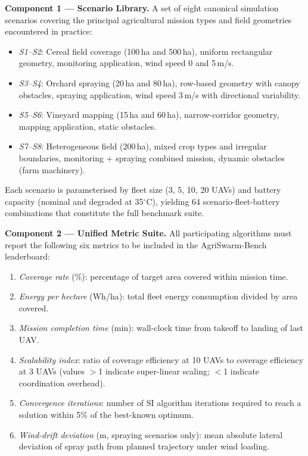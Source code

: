 \documentclass[review,3p,times]{elsarticle}
\begin{document}
\textbf{Component 1 --- Scenario Library.} A set of eight canonical simulation scenarios covering the principal agricultural mission types and field geometries encountered in practice:
\begin{itemize}
  \item \textit{S1--S2}: Cereal field coverage (100\,ha and 500\,ha), uniform rectangular geometry, monitoring application, wind speed 0 and 5\,m/s.
  \item \textit{S3--S4}: Orchard spraying (20\,ha and 80\,ha), row-based geometry with canopy obstacles, spraying application, wind speed 3\,m/s with directional variability.
  \item \textit{S5--S6}: Vineyard mapping (15\,ha and 60\,ha), narrow-corridor geometry, mapping application, static obstacles.
  \item \textit{S7--S8}: Heterogeneous field (200\,ha), mixed crop types and irregular boundaries, monitoring + spraying combined mission, dynamic obstacles (farm machinery).
\end{itemize}
Each scenario is parameterised by fleet size (3, 5, 10, 20 UAVs) and battery capacity (nominal and degraded at 35$^\circ$C), yielding 64 scenario-fleet-battery combinations that constitute the full benchmark suite.

\textbf{Component 2 --- Unified Metric Suite.} All participating algorithms must report the following six metrics to be included in the AgriSwarm-Bench leaderboard:
\begin{enumerate}
  \item \textit{Coverage rate} (\%): percentage of target area covered within mission time.
  \item \textit{Energy per hectare} (Wh/ha): total fleet energy consumption divided by area covered.
  \item \textit{Mission completion time} (min): wall-clock time from takeoff to landing of last UAV.
  \item \textit{Scalability index}: ratio of coverage efficiency at 10 UAVs to coverage efficiency at 3 UAVs (values $>$1 indicate super-linear scaling; $<$1 indicate coordination overhead).
  \item \textit{Convergence iterations}: number of SI algorithm iterations required to reach a solution within 5\% of the best-known optimum.
  \item \textit{Wind-drift deviation} (m, spraying scenarios only): mean absolute lateral deviation of spray path from planned trajectory under wind loading.
\end{enumerate}
\end{document}
